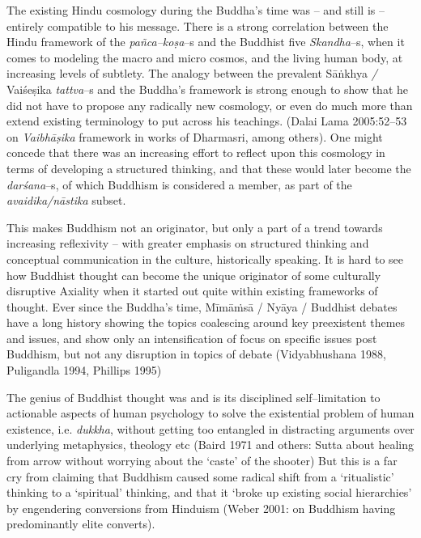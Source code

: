 The existing Hindu cosmology during the Buddha’s time was – and still is – entirely compatible to his message. There is a strong correlation between the Hindu framework of the \textit{pañca–koṣa}–s and the Buddhist five \textit{Skandha}–s, when it comes to modeling the macro and micro cosmos, and the living human body, at increasing levels of subtlety. The analogy between the prevalent Sāṅkhya \textit{/} Vaiśeṣika \textit{tattva}–s and the Buddha’s framework is strong enough to show that he did not have to propose any radically new cosmology, or even do much more than extend existing terminology to put across his teachings. (Dalai Lama 2005:52–53 on \textit{Vaibhāṣika} framework in works of Dharmasri, among others). One might concede that there was an increasing effort to reflect upon this cosmology in terms of developing a structured thinking, and that these would later become the \textit{darśana}–s, of which Buddhism is considered a member, as part of the \textit{avaidika/nāstika} subset.

This makes Buddhism not an originator, but only a part of a trend towards increasing reflexivity – with greater emphasis on structured thinking and conceptual communication in the culture, historically speaking. It is hard to see how Buddhist thought can become the unique originator of some culturally disruptive Axiality when it started out quite within existing frameworks of thought. Ever since the Buddha’s time, Mīmāṁsā / Nyāya / Buddhist debates have a long history showing the topics coalescing around key preexistent themes and issues, and show only an intensification of focus on specific issues post Buddhism, but not any disruption in topics of debate (Vidyabhushana 1988, Puligandla 1994, Phillips 1995)

The genius of Buddhist thought was and is its disciplined self–limitation to actionable aspects of human psychology to solve the existential problem of human existence, i.e. \textit{dukkha}, without getting too entangled in distracting arguments over underlying metaphysics, theology etc (Baird 1971 and others: Sutta about healing from arrow without worrying about the ‘caste’ of the shooter) But this is a far cry from claiming that Buddhism caused some radical shift from a ‘ritualistic’ thinking to a ‘spiritual’ thinking, and that it ‘broke up existing social hierarchies’ by engendering conversions from Hinduism (Weber 2001: on Buddhism having predominantly elite converts).

